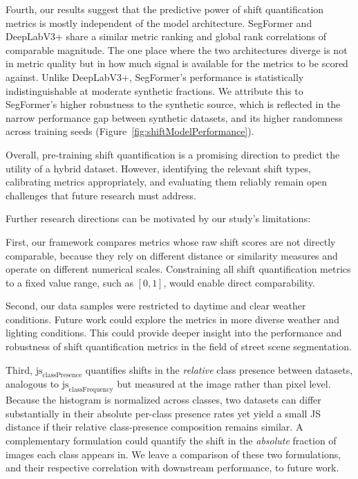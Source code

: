 \documentclass[conference]{IEEEtran}
\begin{document}
Fourth, our results suggest that the predictive power of shift quantification metrics is mostly independent of the model architecture. SegFormer and DeepLabV3+ share a similar metric ranking and global rank correlations of comparable magnitude. The one place where the two architectures diverge is not in metric quality but in how much signal is available for the metrics to be scored against. Unlike DeepLabV3+, SegFormer's performance is statistically indistinguishable at moderate synthetic fractions. We attribute this to SegFormer's higher robustness to the synthetic source, which is reflected in the narrow performance gap between synthetic datasets, and its higher randomness across training seeds (Figure~\ref{fig:shiftModelPerformance}).

Overall, pre-training shift quantification is a promising direction to predict the utility of a hybrid dataset. However, identifying the relevant shift types, calibrating metrics appropriately, and evaluating them reliably remain open challenges that future research must address.

Further research directions can be motivated by our study's limitations: 

First, our framework compares metrics whose raw shift scores are not directly comparable, because they rely on different distance or similarity measures and operate on different numerical scales. Constraining all shift quantification metrics to a fixed value range, such as $[0,1]$, would enable direct comparability.

Second, our data samples were restricted to daytime and clear weather conditions. Future work could explore the metrics in more diverse weather and lighting conditions. This could provide deeper insight into the performance and robustness of shift quantification metrics in the field of street scene segmentation.

Third, $\text{js}_{\text{classPresence}}$ quantifies shifts in the \textit{relative} class presence between datasets, analogous to $\text{js}_{\text{classFrequency}}$ but measured at the image rather than pixel level. Because the histogram is normalized across classes, two datasets can differ substantially in their absolute per-class presence rates yet yield a small JS distance if their relative class-presence composition remains similar. A complementary formulation could quantify the shift in the \textit{absolute} fraction of images each class appears in. We leave a comparison of these two formulations, and their respective correlation with downstream performance, to future work.
\end{document}
